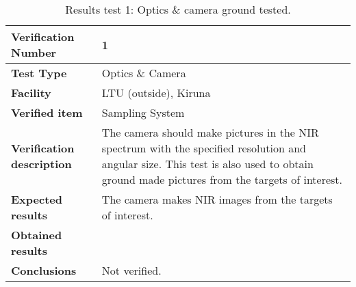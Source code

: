 \begin{table}[H]
\centering

\begin{tabular}{|m{}| m{} |}
\hline
\textbf{Verification Number} 		& 1 					\\ \hline
\textbf{Test Type} 					& Optics \& Camera		\\ \hline
\textbf{Facility} 					& LTU (outside), Kiruna \\ \hline
\textbf{Verified item} 				& Sampling System 		\\ \hline

\textbf{Verification description} 	& The camera should make pictures in the NIR spectrum with the specified resolution and angular size. This test is also used to obtain ground made pictures from the targets of interest.\\ \hline

\textbf{Expected results} 			& The camera makes NIR images from the targets of interest.\\ \hline

\textbf{Obtained results} 			& \\ \hline

\textbf{Conclusions} 				& Not verified.			\\ \hline
\end{tabular}
\caption{Results test 1: Optics \& camera ground tested.}
\label{tab:testresult1:camera-optics}
\end{table}


\raggedbottom